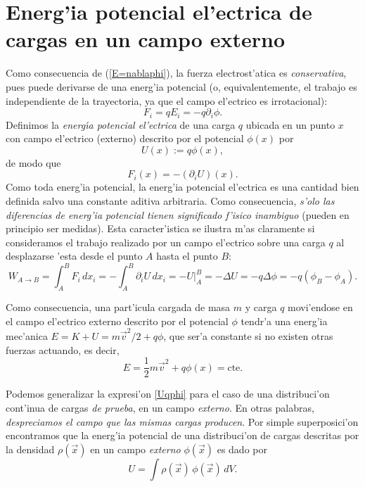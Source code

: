 \section{Energ'ia potencial el'ectrica de cargas en un campo externo}
Como consecuencia de (\ref{E=nablaphi}), la fuerza electrost'atica es
\textit{conservativa}, pues puede derivarse de una energ'ia potencial (o,
equivalentemente, el trabajo es independiente de la trayectoria, ya que el campo
el'ectrico es irrotacional):
\begin{equation}
\boxed{F_i=qE_i=-q\partial_i\phi .}
\end{equation}
Definimos la \textit{energ\'{\i}a potencial el'ectrica} de una carga $q$ ubicada en un punto $x$ con campo el'ectrico (externo) descrito por el potencial $\phi(x)$ por
\begin{equation}
\boxed{U(x):=q\phi(x),} \label{Uqphi}
\end{equation}
de modo
que
\begin{equation}
\boxed{F_i(x)=-(\partial_iU)(x) .}
\end{equation}
Como toda energ'ia potencial, la energ'ia potencial el'ectrica es una
cantidad bien definida salvo una constante aditiva arbitraria. Como
consecuencia, \textit{s'olo las diferencias de energ'ia potencial tienen
significado f'isico inambiguo} (pueden en principio ser medidas). Esta caracter'istica se
ilustra m'as claramente si consideramos el trabajo realizado por un campo
el'ectrico sobre una carga $q$ al desplazarse 'esta desde el punto $A$ hasta el
punto $B$:
\begin{equation}\label{WABDU}
W_{A\rightarrow B}=\int_A^B F_i\, dx_i=-\int_A^B
\partial_iU\,dx_i=-\left.U\right|_A^B=-\Delta U=-q\Delta\phi=-q(\phi_B-\phi_A).
\end{equation}

Como consecuencia, una part'icula cargada de masa $m$ y carga $q$ movi'endose en el campo el'ectrico externo descrito por el potencial $\phi$ tendr'a una energ'ia mec'anica $E=K+U=m\vec{v}^2/2+q\phi$, que ser'a constante si no existen otras fuerzas actuando, es decir,
\begin{equation}
E=\frac{1}{2}m\vec{v}^2+q\phi(x)=\text{cte.}
\end{equation}

Podemos generalizar la expresi'on \eqref{Uqphi} para el caso de una distribuci'on cont'inua de cargas \textit{de prueba}, en un campo \textit{externo}. En otras palabras, \textit{despreciamos el campo que las mismas cargas producen}. Por simple superposici'on encontramos que la energ'ia potencial de una distribuci'on de cargas descritas por la densidad $\rho(\vec{x})$ en un campo \textit{externo} $\phi(\vec{x})$ es dado por
\begin{equation} \label{Urhophiext}
U=\int \rho(\vec{x})\,\phi(\vec{x})\,dV.
\end{equation}


